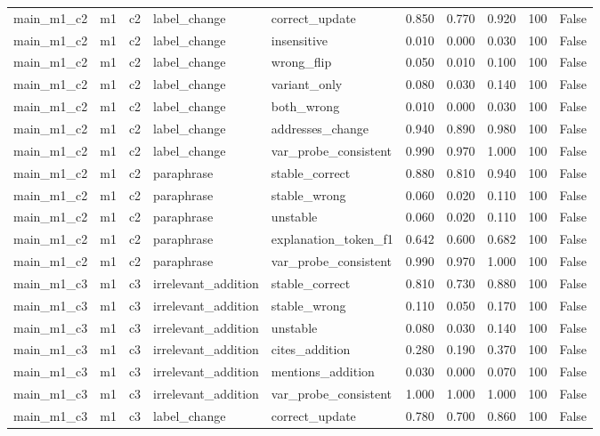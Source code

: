 \begin{tabular}{llllllllll}
main\_m1\_c2 & m1 & c2 & label\_change & correct\_update & 0.850 & 0.770 & 0.920 & 100 & False \\
main\_m1\_c2 & m1 & c2 & label\_change & insensitive & 0.010 & 0.000 & 0.030 & 100 & False \\
main\_m1\_c2 & m1 & c2 & label\_change & wrong\_flip & 0.050 & 0.010 & 0.100 & 100 & False \\
main\_m1\_c2 & m1 & c2 & label\_change & variant\_only & 0.080 & 0.030 & 0.140 & 100 & False \\
main\_m1\_c2 & m1 & c2 & label\_change & both\_wrong & 0.010 & 0.000 & 0.030 & 100 & False \\
main\_m1\_c2 & m1 & c2 & label\_change & addresses\_change & 0.940 & 0.890 & 0.980 & 100 & False \\
main\_m1\_c2 & m1 & c2 & label\_change & var\_probe\_consistent & 0.990 & 0.970 & 1.000 & 100 & False \\
main\_m1\_c2 & m1 & c2 & paraphrase & stable\_correct & 0.880 & 0.810 & 0.940 & 100 & False \\
main\_m1\_c2 & m1 & c2 & paraphrase & stable\_wrong & 0.060 & 0.020 & 0.110 & 100 & False \\
main\_m1\_c2 & m1 & c2 & paraphrase & unstable & 0.060 & 0.020 & 0.110 & 100 & False \\
main\_m1\_c2 & m1 & c2 & paraphrase & explanation\_token\_f1 & 0.642 & 0.600 & 0.682 & 100 & False \\
main\_m1\_c2 & m1 & c2 & paraphrase & var\_probe\_consistent & 0.990 & 0.970 & 1.000 & 100 & False \\
main\_m1\_c3 & m1 & c3 & irrelevant\_addition & stable\_correct & 0.810 & 0.730 & 0.880 & 100 & False \\
main\_m1\_c3 & m1 & c3 & irrelevant\_addition & stable\_wrong & 0.110 & 0.050 & 0.170 & 100 & False \\
main\_m1\_c3 & m1 & c3 & irrelevant\_addition & unstable & 0.080 & 0.030 & 0.140 & 100 & False \\
main\_m1\_c3 & m1 & c3 & irrelevant\_addition & cites\_addition & 0.280 & 0.190 & 0.370 & 100 & False \\
main\_m1\_c3 & m1 & c3 & irrelevant\_addition & mentions\_addition & 0.030 & 0.000 & 0.070 & 100 & False \\
main\_m1\_c3 & m1 & c3 & irrelevant\_addition & var\_probe\_consistent & 1.000 & 1.000 & 1.000 & 100 & False \\
main\_m1\_c3 & m1 & c3 & label\_change & correct\_update & 0.780 & 0.700 & 0.860 & 100 & False \\

\end{tabular}
